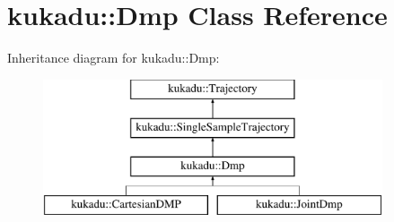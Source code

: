 \hypertarget{classkukadu_1_1Dmp}{\section{kukadu\-:\-:Dmp Class Reference}
\label{classkukadu_1_1Dmp}
}
Inheritance diagram for kukadu\-:\-:Dmp\-:\begin{figure}[H]
\begin{center}
\leavevmode
\includegraphics[height=4.000000cm]{classkukadu_1_1Dmp}
\end{center}
\end{figure}
